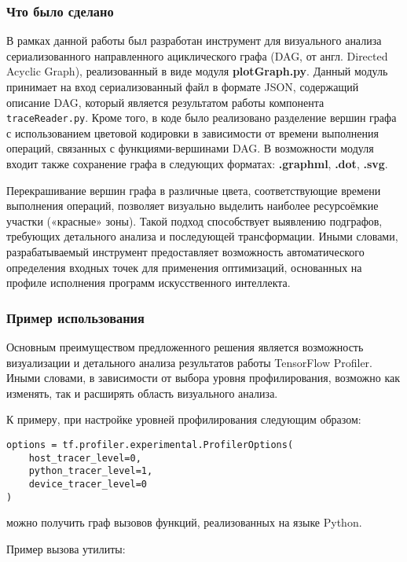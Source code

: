 \subsubsection{Что было сделано}

В рамках данной работы был разработан инструмент для визуального анализа сериализованного направленного ациклического графа (DAG, от англ. Directed Acyclic Graph), реализованный в виде модуля \textbf{plotGraph.py}.
Данный модуль принимает на вход сериализованный файл в формате JSON, содержащий описание DAG, который является результатом работы компонента \texttt{traceReader.py}.
Кроме того, в коде было реализовано разделение вершин графа с использованием цветовой кодировки в зависимости от времени выполнения операций, связанных с функциями-вершинами DAG.
В возможности модуля входит также сохранение графа в следующих форматах: \textbf{.graphml}, \textbf{.dot}, \textbf{.svg}.

Перекрашивание вершин графа в различные цвета, соответствующие времени выполнения операций, позволяет визуально выделить наиболее ресурсоёмкие участки («красные» зоны).
Такой подход способствует выявлению подграфов, требующих детального анализа и последующей трансформации.
Иными словами, разрабатываемый инструмент предоставляет возможность автоматического определения входных точек для применения оптимизаций, основанных на профиле исполнения программ искусственного интеллекта.

\subsubsection{Пример использования}

Основным преимуществом предложенного решения является возможность визуализации и детального анализа результатов работы TensorFlow Profiler.
Иными словами, в зависимости от выбора уровня профилирования, возможно как изменять, так и расширять область визуального анализа.

К примеру, при настройке уровней профилирования следующим образом:

\begin{lstlisting}[caption={Регистрация PGO pipeline-а}]
options = tf.profiler.experimental.ProfilerOptions(
    host_tracer_level=0,
    python_tracer_level=1,
    device_tracer_level=0
)
\end{lstlisting}

можно получить граф вызовов функций, реализованных на языке Python.

Пример вызова утилиты:

